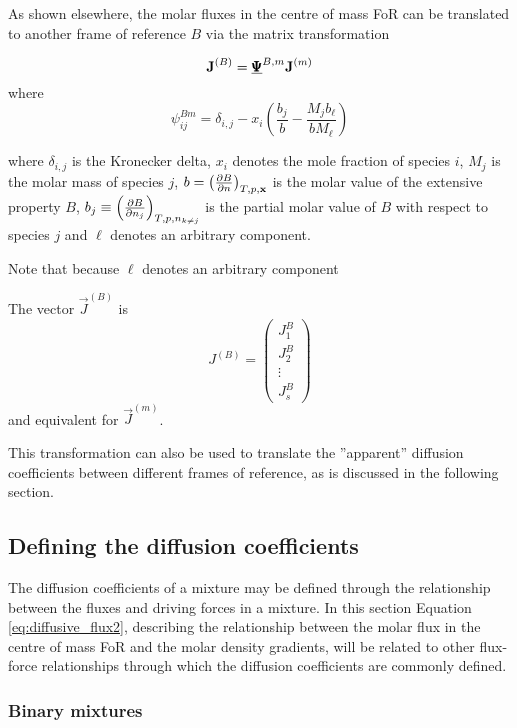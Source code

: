 As shown elsewhere,\cite{prosjektoppgave} the molar fluxes in the centre of mass FoR can be translated to another frame of reference $B$ via the matrix transformation

\begin{equation}
    \boldsymbol{\mathrm{J}}^{(B)} = \underline{\pmb{\Psi}}^{B,m} \boldsymbol{\mathrm{J}}^{(m)}
    \label{eq:flux_transform_for}
\end{equation}
where 
\begin{equation}
    \psi_{ij}^{Bm} = \delta_{i,j} - x_i \left( \frac{b_j}{b} - \frac{M_j b_\ell}{b M_\ell}\right)
\end{equation}

where $\delta_{i,j}$ is the Kronecker delta, $x_i$ denotes the mole fraction of species $i$, $M_j$ is the molar mass of species $j$, $b = \left(\frac{\partial B}{\partial n}\right)_{T,p,\boldsymbol{\mathrm{x}}}$ is the molar value of the extensive property $B$, $b_j \equiv \left(\frac{\partial B}{\partial n_j}\right)_{T,p,n_{k \neq j}}$ is the partial molar value of $B$ with respect to species $j$ and $\ell$ denotes an arbitrary component.

Note that because $\ell$ denotes an arbitrary component

The vector $\Vec{J}^{(B)}$ is
\begin{equation}
    J^{(B)} = 
    \begin{pmatrix}
        J^B_1 \\ J^B_2 \\ \vdots \\ J^B_s
    \end{pmatrix}
\end{equation}
and equivalent for $\Vec{J}^{(m)}$. 

This transformation can also be used to translate the ''apparent'' diffusion coefficients between different frames of reference, as is discussed in the following section.

\subsection{Defining the diffusion coefficients}
The diffusion coefficients of a mixture may be defined through the relationship between the fluxes and driving forces in a mixture. In this section Equation \eqref{eq:diffusive_flux2}, describing the relationship between the molar flux in the centre of mass FoR and the molar density gradients, will be related to other flux-force relationships through which the diffusion coefficients are commonly defined.

\subsubsection{Binary mixtures}

